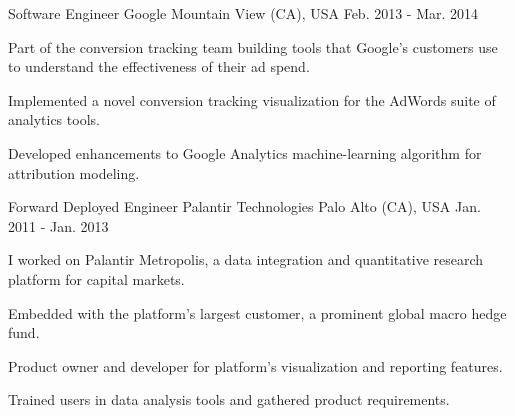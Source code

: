 \begin{cventries}
  \cventry
    {Software Engineer} %
    {Google} %
    {Mountain View (CA), USA} %
    {Feb. 2013 - Mar. 2014} %
    {
      Part of the conversion tracking team building tools that Google's customers use to understand the effectiveness of their ad spend.
      \vspace{5.0mm}
      \begin{cvitems} %
        \item {Implemented a novel conversion tracking visualization for the AdWords suite of analytics tools.}
        \item {Developed enhancements to Google Analytics machine-learning algorithm for attribution modeling.}
      \end{cvitems}
    }

  \cventry
    {Forward Deployed Engineer} %
    {Palantir Technologies} %
    {Palo Alto (CA), USA} %
    {Jan. 2011 - Jan. 2013} %
    {
      I worked on Palantir Metropolis, a data integration and quantitative research platform for capital markets.
      \vspace{5.0mm}
      \begin{cvitems} %
        \item {Embedded with the platform's largest customer, a prominent global macro hedge fund.}
        \item {Product owner and developer for platform's visualization and reporting features.}
        \item {Trained users in data analysis tools and gathered product requirements.}
      \end{cvitems}
    }

\end{cventries}
